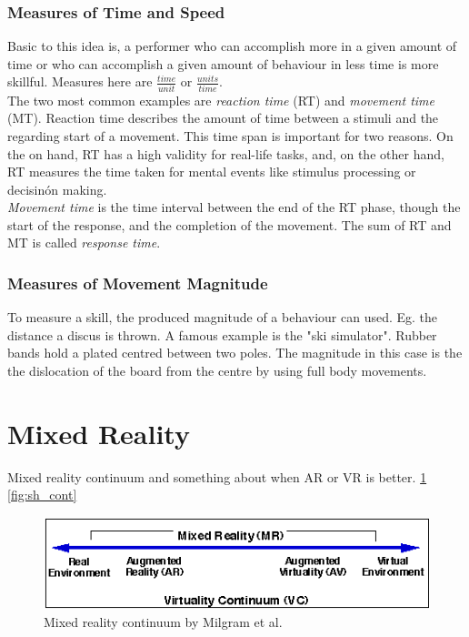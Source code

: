 \subsubsection{Measures of Time and Speed}
Basic to this idea is, a performer who can accomplish more in a given amount of time or who can accomplish a given amount of behaviour in less time is  more skillful. Measures here are
$\frac{time}{unit}$ or $\frac{units}{time}$.\\
The two most common examples are \textit{reaction time} (RT) and \textit{movement time} (MT). Reaction time describes the amount of time between a stimuli and the regarding start of a movement. This time span is important for two reasons. On the on hand, RT has a high validity for real-life tasks, and, on the other hand, RT measures the time taken for mental events like stimulus processing or decisinón making.\\
\textit{Movement time} is the time interval between the end of the RT phase, though the start of the response, and the completion of the movement. The sum of RT and MT is called \textit{response time}.

\subsubsection{Measures of Movement Magnitude}
To measure a skill, the produced magnitude of a behaviour can used. Eg. the distance a discus is thrown. A famous example is the "ski simulator". Rubber bands hold a plated centred between two poles. The magnitude in this case is the the dislocation of the board from the centre by using full body movements.

\section{Mixed Reality}
\todo
Mixed reality continuum \cite{Milgram1994} and something about when AR or VR is better. \ref{fig:MRcont} \ref{fig:sh_cont}\todo 

\begin{figure}
	\centering
	\includegraphics[width=1.0\textwidth]{img/milgram_continuum.png}
	\caption{Mixed reality continuum by Milgram et al. \cite{Milgram1994}}
	\label{fig:MRcont}
\end{figure}

